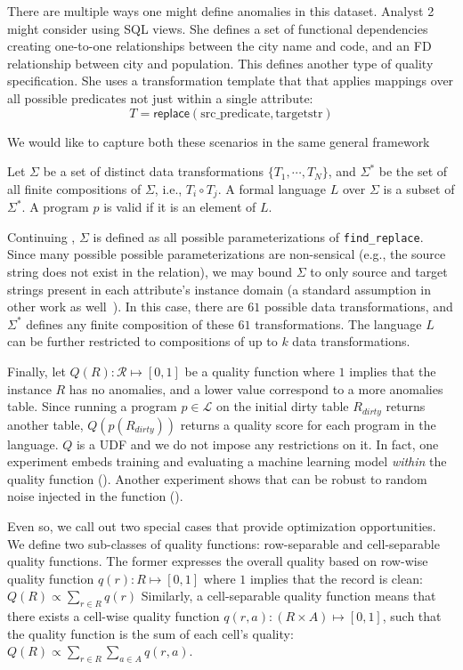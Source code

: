 \begin{example}
There are multiple ways one might define anomalies in this dataset. Analyst 2 might consider using SQL views. She defines a set of functional dependencies creating one-to-one relationships between the city name and code, and an FD relationship between city and population. This defines another type of quality specification. She uses a transformation template that that applies mappings over all possible predicates not just within a single attribute: 
{\small\[
T = \textsf{replace}(\text{src\_predicate}, \text{targetstr})
\]}

We would like to capture both these scenarios in the same general framework
\end{example}


Let $\Sigma$ be a set of distinct data transformations $\{T_1,\cdots,T_N\}$, and
$\Sigma^*$ be the set of all finite compositions of $\Sigma$, i.e., $T_i\circ T_j$.
A formal language $L$ over $\Sigma$ is a subset of $\Sigma^*$.
A program $p$ is valid if it is an element of $L$.

\begin{example}\label{ex2}
  Continuing , $\Sigma$ is defined as all possible parameterizations of \texttt{find\_replace}.  Since many possible possible parameterizations are non-sensical (e.g., the source string does not exist in the relation), we may bound $\Sigma$ to only source and target strings present in each attribute's instance domain (a standard assumption in other work as well~\cite{DBLP:series/synthesis/2012Fan}).  In this case, there are $61$ possible data transformations, and $\Sigma^*$ defines any finite composition of these $61$ transformations.  The language $L$ can be further restricted to compositions of up to $k$ data transformations.  
\end{example}

Finally, let $Q(R): \mathcal{R} \mapsto [0,1]$ be a quality function where $1$ implies that the instance $R$ has no anomalies, and a lower value correspond to a more anomalies table.
Since running a program $p\in\mathcal{L}$ on the initial dirty table $R_{dirty}$ returns another table, $Q(p(R_{dirty}))$ returns a quality score for each program in the language.  
$Q$ is a UDF and we do not impose any restrictions on it. In fact, one experiment embeds training and evaluating a machine learning model {\it within} the quality function ().  Another experiment shows that \sys can be robust to random noise injected in the function ().   

Even so, we call out two special cases that provide optimization opportunities. 
We define two sub-classes of quality functions: row-separable and cell-separable quality functions.
The former expresses the overall quality based on row-wise quality function $q(r): R \mapsto [0,1]$ where $1$ implies that the record is clean:
$Q(R) \propto \sum\nolimits_{r \in R} q(r)$
Similarly, a cell-separable quality function means that there exists a cell-wise quality function $q(r, a): (R\times A) \mapsto [0,1]$, such that the quality function is the sum of each cell's quality: 
$Q(R) \propto \sum\nolimits_{r \in R} \sum_{a \in A} q(r,a)$.

